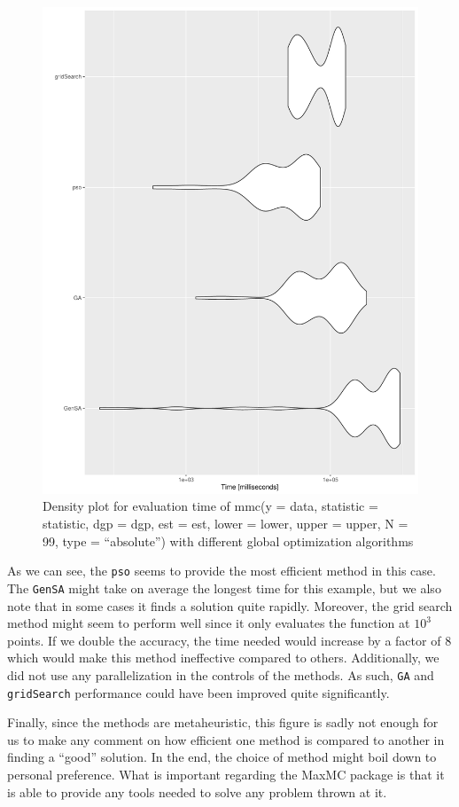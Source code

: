 \documentclass[]{article}\usepackage[]{graphicx}\usepackage[]{color}
\newcommand{\pkg}[1]{{\normalfont\fontseries{b}\selectfont #1}}
\let\code=\texttt
\begin{document}
\begin{figure}[H]
\centering
\includegraphics[width=0.9\linewidth]{fig/BF_compare}
\caption{Density plot for evaluation time of mmc(y = data, statistic = statistic, dgp = dgp, est = est, lower = lower, upper = upper, N = 99,	type = ``absolute'') with different global optimization algorithms}
\label{fig:bfcompare}
\end{figure}

As we can see, the \code{pso} seems to provide the most efficient method in this case. The \code{GenSA} might take on average the longest time for this example, but we also note that in some cases it finds a solution quite rapidly. Moreover, the grid search method might seem to perform well since it only evaluates the function at $10^3$ points. If we double the accuracy, the time needed would increase by a factor of 8 which would make this method ineffective compared to others. Additionally, we did not use any parallelization in the controls of the methods. As such, \code{GA} and \code{gridSearch} performance could have been improved quite significantly.

Finally, since the methods are metaheuristic, this figure is sadly not enough for us to make any comment on how efficient one method is compared to another in finding a ``good'' solution. In the end, the choice of method might boil down to personal preference. What is important regarding the \pkg{MaxMC} package is that it is able to provide any tools needed to solve any problem thrown at it.
\end{document}
